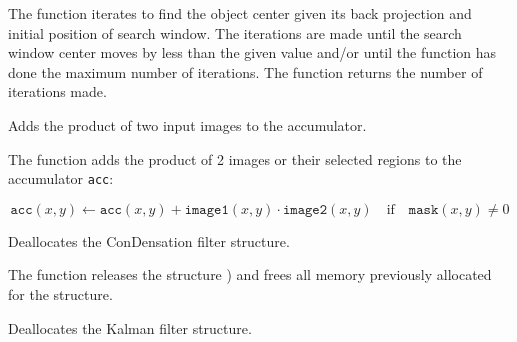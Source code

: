 The function iterates to find the object center
given its back projection and initial position of search window. The
iterations are made until the search window center moves by less than
the given value and/or until the function has done the maximum number
of iterations. The function returns the number of iterations made.

Adds the product of two input images to the accumulator.


\begin{description}
\end{description}

The function adds the product of 2 images or their selected regions to the accumulator \texttt{acc}:

\[ \texttt{acc}(x,y) \leftarrow \texttt{acc}(x,y) + \texttt{image1}(x,y) \cdot \texttt{image2}(x,y) \quad \text{if} \quad \texttt{mask}(x,y) \ne 0 \]

\ifC %
Deallocates the ConDensation filter structure.

\begin{description}
\end{description}

The function releases the structure ) and frees all memory previously allocated for the structure.

\fi %

\ifC %

Deallocates the Kalman filter structure.


